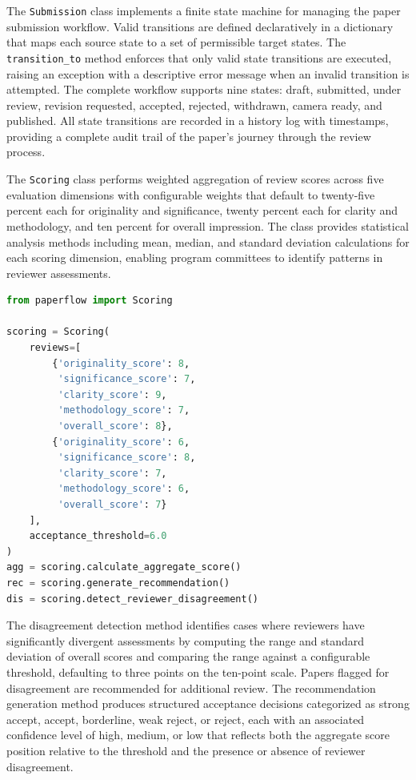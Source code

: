 \documentclass[conference]{IEEEtran}
\begin{document}
The \texttt{Submission} class implements a finite state machine for managing the paper submission workflow. Valid transitions are defined declaratively in a dictionary that maps each source state to a set of permissible target states. The \texttt{transition\_to} method enforces that only valid state transitions are executed, raising an exception with a descriptive error message when an invalid transition is attempted. The complete workflow supports nine states: draft, submitted, under review, revision requested, accepted, rejected, withdrawn, camera ready, and published. All state transitions are recorded in a history log with timestamps, providing a complete audit trail of the paper's journey through the review process.

The \texttt{Scoring} class performs weighted aggregation of review scores across five evaluation dimensions with configurable weights that default to twenty-five percent each for originality and significance, twenty percent each for clarity and methodology, and ten percent for overall impression. The class provides statistical analysis methods including mean, median, and standard deviation calculations for each scoring dimension, enabling program committees to identify patterns in reviewer assessments.

\begin{lstlisting}[language=Python, caption={Scoring class with weighted aggregation}]
from paperflow import Scoring

scoring = Scoring(
    reviews=[
        {'originality_score': 8,
         'significance_score': 7,
         'clarity_score': 9,
         'methodology_score': 7,
         'overall_score': 8},
        {'originality_score': 6,
         'significance_score': 8,
         'clarity_score': 7,
         'methodology_score': 6,
         'overall_score': 7}
    ],
    acceptance_threshold=6.0
)
agg = scoring.calculate_aggregate_score()
rec = scoring.generate_recommendation()
dis = scoring.detect_reviewer_disagreement()
\end{lstlisting}

The disagreement detection method identifies cases where reviewers have significantly divergent assessments by computing the range and standard deviation of overall scores and comparing the range against a configurable threshold, defaulting to three points on the ten-point scale. Papers flagged for disagreement are recommended for additional review. The recommendation generation method produces structured acceptance decisions categorized as strong accept, accept, borderline, weak reject, or reject, each with an associated confidence level of high, medium, or low that reflects both the aggregate score position relative to the threshold and the presence or absence of reviewer disagreement.
\end{document}

